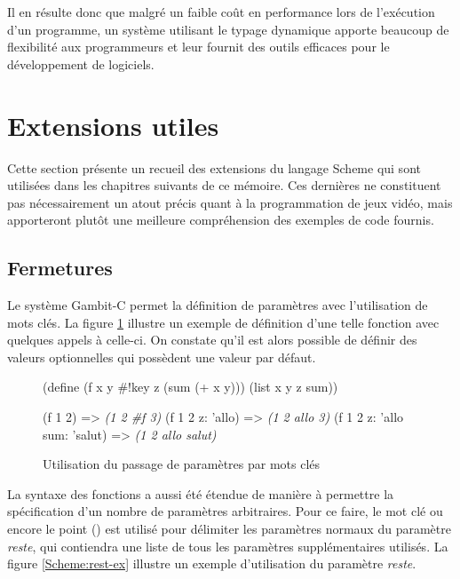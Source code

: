 \documentclass[12pt,twoside,letterpaper,francais]{book}
\newcommand{\scheme}[1]{\selectlanguage{english}{\tt #1}\selectlanguage{french}}
\newcommand{\schemeresult}[1]{{\it #1}}
\begin{document}
Il en résulte donc que malgré un faible coût en performance lors de
l'exécution d'un programme, un système utilisant le typage dynamique
apporte beaucoup de flexibilité aux programmeurs et leur fournit des
outils efficaces pour le dévelop\-pement de logiciels.



\FloatBarrier
\section{Extensions utiles}
Cette section présente un recueil des extensions du langage
Scheme qui sont utilisées dans les chapitres suivants de ce
mémoire. Ces dernières ne constituent pas nécessairement un atout
précis quant à la programmation de jeux vidéo, mais apporteront plutôt
une meilleure compréhension des exemples de code fournis.


\FloatBarrier
\subsection{Fermetures}
Le système Gambit-C permet la définition de paramètres avec
l'utilisation de mots clés. La figure \ref{Scheme:fun-key} illustre un
exemple de définition d'une telle fonction avec quelques appels à
celle-ci. On constate qu'il est alors possible de définir des valeurs
optionnelles qui possèdent une valeur par défaut.\\

\begin{figure}[htb!]
  \begin{schemecode}
(define (f x y \#!key z (sum (+ x y)))
  (list x y z sum))

(f 1 2)                      => \schemeresult{(1 2 \#f 3)}
(f 1 2 z: 'allo)             => \schemeresult{(1 2 allo 3)}
(f 1 2 z: 'allo sum: 'salut) => \schemeresult{(1 2 allo salut)}
  \end{schemecode}
  \caption{Utilisation du passage de paramètres par mots clés}
  \label{Scheme:fun-key}
\end{figure}

La syntaxe des fonctions a aussi été étendue de manière à permettre la
spécification d'un nombre de paramètres arbitraires. Pour ce faire, le
mot clé \scheme{\#!rest} ou encore le point (\scheme{.}) est utilisé
pour délimiter les paramètres normaux du paramètre \textit{reste}, qui
contiendra une liste de tous les paramètres supplémentaires
utilisés. La figure \ref{Scheme:rest-ex} illustre un exemple
d'utilisation du paramètre \textit{reste}.\\
\end{document}
